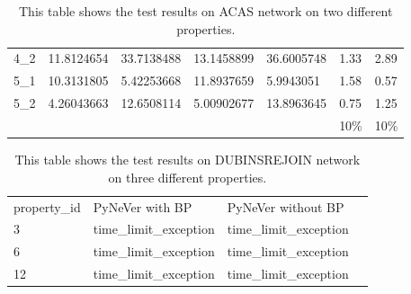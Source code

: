 \begin{table}[]
{\begin{tabular}{lllllll}
    4\_2                        & {\color[HTML]{ACB9CA} 11.8124654} & {\color[HTML]{ACB9CA} 33.7138488} & {\color[HTML]{ACB9CA} 13.1458899} & {\color[HTML]{ACB9CA} 36.6005748} & {\color[HTML]{ACB9CA} 1.33} & {\color[HTML]{ACB9CA} 2.89} \\
    5\_1                        & {\color[HTML]{ACB9CA} 10.3131805} & {\color[HTML]{ACB9CA} 5.42253668} & {\color[HTML]{ACB9CA} 11.8937659} & {\color[HTML]{ACB9CA} 5.9943051}  & {\color[HTML]{ACB9CA} 1.58} & {\color[HTML]{ACB9CA} 0.57} \\
    5\_2                        & {\color[HTML]{ACB9CA} 4.26043663} & {\color[HTML]{ACB9CA} 12.6508114} & {\color[HTML]{ACB9CA} 5.00902677} & {\color[HTML]{ACB9CA} 13.8963645} & {\color[HTML]{ACB9CA} 0.75} & {\color[HTML]{ACB9CA} 1.25} \\\cmidrule(r){1-7}
                                &                                   &                                   &                                   &                                   & {\color[HTML]{FF0000} 10\%} & {\color[HTML]{FF0000} 10\%} \\\cmidrule(r){1-7}      
    \end{tabular}%
    }
    \caption{This table shows the test results on ACAS network on two different properties.}
    \label{table:ACAS}
    \end{table}


\begin{table}[]
    \centering
    \begin{tabular}{@{}llll@{}}
    \toprule
    property\_id & PyNeVer with BP                               & PyNeVer without BP                            &  \\ \cmidrule(r){1-3}
    3            & {\color[HTML]{ACB9CA} time\_limit\_exception} & {\color[HTML]{ACB9CA} time\_limit\_exception} &  \\
    6            & {\color[HTML]{ACB9CA} time\_limit\_exception} & {\color[HTML]{ACB9CA} time\_limit\_exception} &  \\
    12           & {\color[HTML]{ACB9CA} time\_limit\_exception} & {\color[HTML]{ACB9CA} time\_limit\_exception} &  \\ \cmidrule(r){1-3}
    \end{tabular}%
    \caption{This table shows the test results on DUBINSREJOIN network on three different properties.}
    \label{table:DUBINS}
\end{table}


